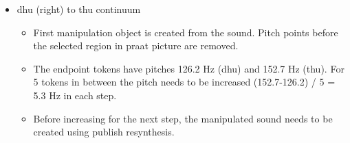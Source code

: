 \documentclass[12pt, english]{article}
\begin{document}
\begin{itemize}
    \item dhu (right) to thu continuum
    \begin{itemize}
        \item First manipulation object is created from the sound. Pitch points before the selected region in praat picture are removed.
        \item The endpoint tokens have pitches 126.2 Hz (dhu) and 152.7 Hz (thu). For 5 tokens in between the pitch needs to be increased (152.7-126.2) / 5 = 5.3 Hz in each step.
        \item Before increasing for the next step, the manipulated sound needs to be created using publish resynthesis.
    \end{itemize}  
\end{itemize}



\end{document}
